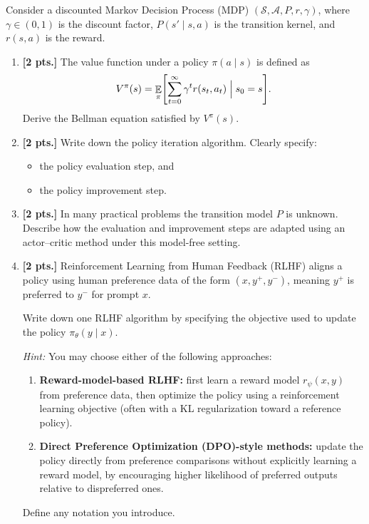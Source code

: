 \documentclass[11pt,a4paper]{article}
\DeclareMathOperator{\E}{\mathbb{E}}
\newcommand{\examstatement}[1]{%
  \par\addvspace{0.85em}%
  \noindent{\bfseries #1}\par\nobreak\addvspace{0.28em}%
}
\begin{document}
\examstatement{Problem 3. [8 pts.]}
Consider a discounted Markov Decision Process (MDP) $(\mathcal{S}, \mathcal{A}, P, r, \gamma)$, where $\gamma \in (0, 1)$ is the discount factor, $P(s' \mid s, a)$ is the transition kernel, and $r(s, a)$ is the reward.
\begin{enumerate}[label=(\alph*)]
    \item \textbf{[2 pts.]} The value function under a policy $\pi(a \mid s)$ is defined as
    \[
    V^{\pi}(s) = \E_{\pi} \Biggl[ \sum_{t=0}^{\infty} \gamma^{t} r(s_t, a_t) \Bigm| s_0 = s \Biggr].
    \]
    Derive the Bellman equation satisfied by $V^{\pi}(s)$.
    \item \textbf{[2 pts.]} Write down the policy iteration algorithm. Clearly specify:
    \begin{itemize}
        \item the policy evaluation step, and
        \item the policy improvement step.
    \end{itemize}
    \item \textbf{[2 pts.]} In many practical problems the transition model $P$ is unknown. Describe how the evaluation and improvement steps are adapted using an actor--critic method under this model-free setting.
    \item \textbf{[2 pts.]} Reinforcement Learning from Human Feedback (RLHF) aligns a policy using human preference data of the form $(x, y^{+}, y^{-})$, meaning $y^{+}$ is preferred to $y^{-}$ for prompt $x$.

    Write down one RLHF algorithm by specifying the objective used to update the policy $\pi_{\theta}(y \mid x)$.

    \textit{Hint:} You may choose either of the following approaches:
    \begin{enumerate}[label=(\alph*)]
        \item \textbf{Reward-model-based RLHF:} first learn a reward model $r_{\psi}(x, y)$ from preference data, then optimize the policy using a reinforcement learning objective (often with a KL regularization toward a reference policy).
        \item \textbf{Direct Preference Optimization (DPO)-style methods:} update the policy directly from preference comparisons without explicitly learning a reward model, by encouraging higher likelihood of preferred outputs relative to dispreferred ones.
    \end{enumerate}
    Define any notation you introduce.
\end{enumerate}
\end{document}
